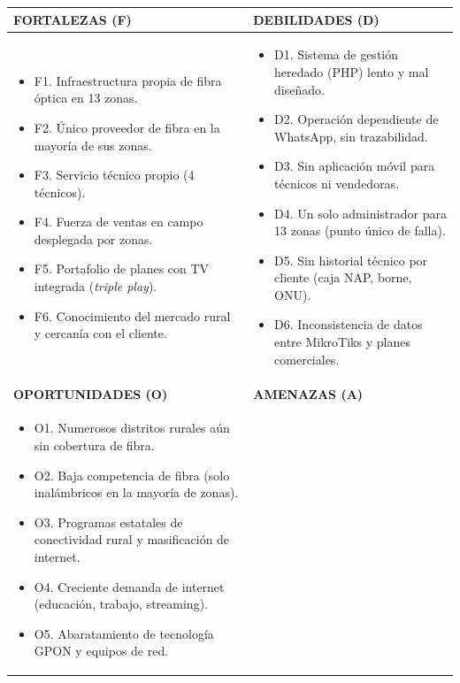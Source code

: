 \begin{center}
\label{tab:foda}
\begin{tabularx}{\textwidth}{X X}
\toprule
\rowcolor{upeublue!10}
\textbf{FORTALEZAS (F)} & \textbf{DEBILIDADES (D)} \\
\midrule
\begin{itemize}[leftmargin=1.4em,nosep]
  \item F1. Infraestructura propia de fibra óptica en 13 zonas.
  \item F2. Único proveedor de fibra en la mayoría de sus zonas.
  \item F3. Servicio técnico propio (4 técnicos).
  \item F4. Fuerza de ventas en campo desplegada por zonas.
  \item F5. Portafolio de planes con TV integrada (\textit{triple play}).
  \item F6. Conocimiento del mercado rural y cercanía con el cliente.
\end{itemize}
&
\begin{itemize}[leftmargin=1.4em,nosep]
  \item D1. Sistema de gestión heredado (PHP) lento y mal diseñado.
  \item D2. Operación dependiente de WhatsApp, sin trazabilidad.
  \item D3. Sin aplicación móvil para técnicos ni vendedoras.
  \item D4. Un solo administrador para 13 zonas (punto único de falla).
  \item D5. Sin historial técnico por cliente (caja NAP, borne, ONU).
  \item D6. Inconsistencia de datos entre MikroTiks y planes comerciales.
\end{itemize}
\\
\midrule
\rowcolor{upeublue!10}
\textbf{OPORTUNIDADES (O)} & \textbf{AMENAZAS (A)} \\
\midrule
\begin{itemize}[leftmargin=1.4em,nosep]
  \item O1. Numerosos distritos rurales aún sin cobertura de fibra.
  \item O2. Baja competencia de fibra (solo inalámbricos en la mayoría de zonas).
  \item O3. Programas estatales de conectividad rural y masificación de internet.
  \item O4. Creciente demanda de internet (educación, trabajo, streaming).
  \item O5. Abaratamiento de tecnología GPON y equipos de red.

\end{itemize}
\end{tabularx}
\end{center}
